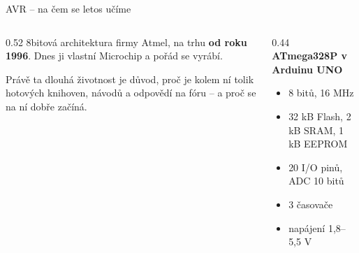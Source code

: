 \documentclass[12pt,aspectratio=169]{beamer}
\begin{document}
\begin{frame}{AVR -- na čem se letos učíme}
  \begin{columns}[T]
    \begin{column}{0.52\textwidth}
      \small
      8bitová architektura firmy Atmel, na trhu \textbf{od roku 1996}.
      Dnes ji vlastní Microchip a pořád se vyrábí.

      \vspace{3mm}
      Právě ta dlouhá životnost je důvod, proč je kolem ní tolik hotových
      knihoven, návodů a odpovědí na fóru -- a proč se na ní dobře začíná.
    \end{column}
    \begin{column}{0.44\textwidth}
      \footnotesize
      \textbf{ATmega328P v Arduinu UNO}
      \begin{itemize}
        \item 8 bitů, 16 MHz
        \item 32 kB Flash, 2 kB SRAM, 1 kB EEPROM
        \item 20 I/O pinů, ADC 10 bitů
        \item 3 časovače
        \item napájení 1,8--5,5 V
      \end{itemize}
    \end{column}
  \end{columns}
\end{frame}
\end{document}

